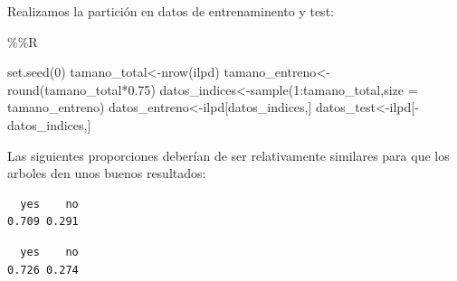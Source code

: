 \documentclass[
  11pt,
  a4paper,
]{article}
\newenvironment{Shaded}{\begin{snugshade}}{\end{snugshade}}
\newcommand{\AttributeTok}[1]{\textcolor[rgb]{0.77,0.63,0.00}{#1}}
\newcommand{\DecValTok}[1]{\textcolor[rgb]{0.00,0.00,0.81}{#1}}
\newcommand{\FloatTok}[1]{\textcolor[rgb]{0.00,0.00,0.81}{#1}}
\newcommand{\FunctionTok}[1]{\textcolor[rgb]{0.00,0.00,0.00}{#1}}
\newcommand{\NormalTok}[1]{#1}
\newcommand{\OtherTok}[1]{\textcolor[rgb]{0.56,0.35,0.01}{#1}}
\newcommand{\SpecialCharTok}[1]{\textcolor[rgb]{0.00,0.00,0.00}{#1}}
\begin{document}
Realizamos la partición en datos de entrenaminento y test:

\begin{Shaded}
\begin{Highlighting}[]
\SpecialCharTok{\%\%}\NormalTok{R}

\FunctionTok{set.seed}\NormalTok{(}\DecValTok{0}\NormalTok{)}
\NormalTok{tamano\_total}\OtherTok{\textless{}{-}}\FunctionTok{nrow}\NormalTok{(ilpd)}
\NormalTok{tamano\_entreno}\OtherTok{\textless{}{-}}\FunctionTok{round}\NormalTok{(tamano\_total}\SpecialCharTok{*}\FloatTok{0.75}\NormalTok{)}
\NormalTok{datos\_indices}\OtherTok{\textless{}{-}}\FunctionTok{sample}\NormalTok{(}\DecValTok{1}\SpecialCharTok{:}\NormalTok{tamano\_total,}\AttributeTok{size =}\NormalTok{ tamano\_entreno)}
\NormalTok{datos\_entreno}\OtherTok{\textless{}{-}}\NormalTok{ilpd[datos\_indices,]}
\NormalTok{datos\_test}\OtherTok{\textless{}{-}}\NormalTok{ilpd[}\SpecialCharTok{{-}}\NormalTok{datos\_indices,]}
\end{Highlighting}
\end{Shaded}

Las siguientes proporciones deberían de ser relativamente similares para
que los arboles den unos buenos resultados:

\begin{Shaded}
\end{Shaded}

\begin{verbatim}
  yes    no 
0.709 0.291 
\end{verbatim}

\begin{Shaded}
\end{Shaded}

\begin{verbatim}
  yes    no 
0.726 0.274 
\end{verbatim}
\end{document}
